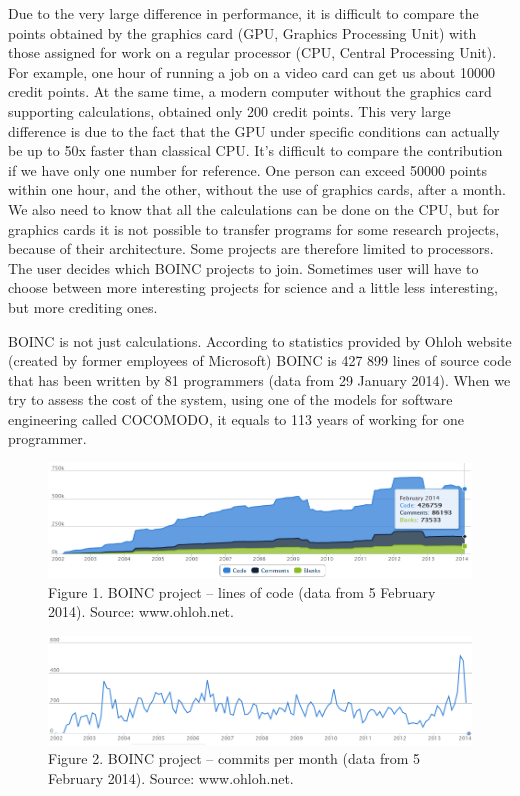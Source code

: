 \documentclass[10pt, a5paper]{article}
\begin{document}
Due to the very large difference in performance, it is difficult to compare the points obtained by the graphics card (GPU, Graphics Processing Unit) with those assigned for work on a regular processor (CPU, Central Processing Unit). For example, one hour of running a job on a video card can get us about 10000 credit points. At the same time, a modern computer without the graphics card supporting calculations, obtained only 200 credit points. This very large difference is due to the fact that the GPU under specific conditions can actually be up to 50x faster than classical CPU. It's difficult to compare the contribution if we have only one number for reference. One person can exceed 50000 points within one hour, and the other, without the use of graphics cards, after a month. We also need to know that all the calculations can be done on the CPU, but for graphics cards it is not possible to transfer programs for some research projects, because of their architecture. Some projects are therefore limited to processors. The user decides which BOINC projects to join. Sometimes user  will have to choose between more interesting projects for science and a little less interesting, but more crediting ones.

BOINC is not just calculations. According to statistics provided by Ohloh website (created by former employees of Microsoft) BOINC is 427 899 lines of source code that has been written by 81 programmers (data from 29 January 2014). When we try to assess the cost of the system, using one of the models for software engineering called CO\-CO\-MO\-DO, it equals to 113 years of working for one programmer.

\begin{figure}[b!]
  \centering
  \includegraphics[width=\textwidth]{104_2014_w_Swierczewski_ohloh1.png}
  Figure 1. BOINC project – lines of code (data from 5 February 2014). Source: www.ohloh.net.
\end{figure}

\begin{figure}[b!]
  \centering
  \includegraphics[width=\textwidth]{104_2014_w_Swierczewski_ohloh2.png}
  Figure 2. BOINC project – commits per month (data from 5 February 2014). Source: www.ohloh.net.
\end{figure}
\end{document}
